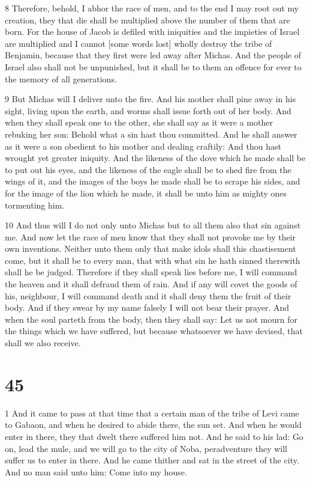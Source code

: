\par 8 Therefore, behold, I abhor the race of men, and to the end I may root out my creation, they that die shall be multiplied above the number of them that are born. For the house of Jacob is defiled with iniquities and the impieties of Israel are multiplied and I cannot [some words lost] wholly destroy the tribe of Benjamin, because that they first were led away after Michas. And the people of Israel also shall not be unpunished, but it shall be to them an offence for ever to the memory of all generations. 

\par 9 But Michas will I deliver unto the fire. And his mother shall pine away in his sight, living upon the earth, and worms shall issue forth out of her body. And when they shall speak one to the other, she shall say as it were a mother rebuking her son: Behold what a sin hast thou committed. And he shall answer as it were a son obedient to his mother and dealing craftily: And thou hast wrought yet greater iniquity. And the likeness of the dove which he made shall be to put out his eyes, and the likeness of the eagle shall be to shed fire from the wings of it, and the images of the boys he made shall be to scrape his sides, and for the image of the lion which he made, it shall be unto him as mighty ones tormenting him. 

\par 10 And thus will I do not only unto Michas but to all them also that sin against me. And now let the race of men know that they shall not provoke me by their own inventions. Neither unto them only that make idols shall this chastisement come, but it shall be to every man, that with what sin he hath sinned therewith shall he be judged. Therefore if they shall speak lies before me, I will command the heaven and it shall defraud them of rain. And if any will covet the goods of his, neighbour, I will command death and it shall deny them the fruit of their body. And if they swear by my name falsely I will not bear their prayer. And when the soul parteth from the body, then they shall say: Let us not mourn for the things which we have suffered, but because whatsoever we have devised, that shall we also receive. 

\chapter{45}

\par 1 And it came to pass at that time that a certain man of the tribe of Levi came to Gabaon, and when he desired to abide there, the sun set. And when he would enter in there, they that dwelt there suffered him not. And he said to his lad: Go on, lead the mule, and we will go to the city of Noba, peradventure they will suffer us to enter in there. And he came thither and sat in the street of the city. And no man said unto him: Come into my house. 

